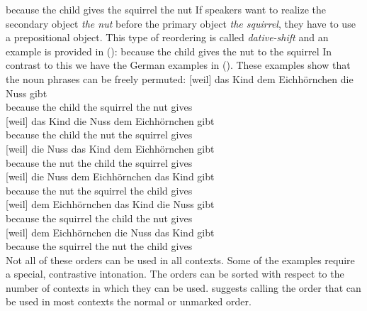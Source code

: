 \ea
because the child gives the squirrel the nut 
\z
If speakers want to realize the secondary object \emph{the nut} before the primary object \emph{the
  squirrel}, they have to use a prepositional object. This type of reordering is called
\emph{dative-shift} and an example is provided in ():
\ea
because the child gives the nut to the squirrel 
\z
In contrast to this we have the German examples in (). These examples show that the noun
phrases can be freely permuted:
\eal
\ex 
\gll {}[weil]          das Kind dem Eichhörnchen die Nuss gibt\\
     \spacebr{}because the child the squirrel the nut gives\\
\ex 
\gll {}[weil]          das Kind die Nuss dem Eichhörnchen  gibt\\
     \spacebr{}because the child  the nut the squirrel gives\\
\ex 
\gll {}[weil]          die Nuss das Kind dem Eichhörnchen  gibt\\
     \spacebr{}because the nut the child  the squirrel gives\\
\ex 
\gll {}[weil]          die Nuss dem Eichhörnchen  das Kind gibt\\
     \spacebr{}because the nut the squirrel the child  gives\\
\ex 
\gll {}[weil]          dem Eichhörnchen  das Kind die Nuss gibt\\
     \spacebr{}because the squirrel the child  the nut gives\\
\ex 
\gll {}[weil]          dem Eichhörnchen  die Nuss das Kind gibt\\
     \spacebr{}because the squirrel the nut the child  gives\\
\zl
Not all of these orders can be used in all contexts. Some of the examples require a special,
contrastive intonation. The orders can be sorted with respect to the number of contexts in which
they can be used. \citet{Hoehle82a} suggests calling the order that can be used in most contexts the
normal or unmarked order.

